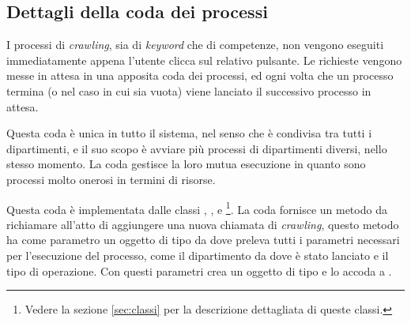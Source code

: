 \documentclass[tesi.tex]{subfiles}
\begin{document}
\subsection{Dettagli della coda dei processi}\label{sec:codaprocessi}
I processi di \emph{crawling}, sia di \emph{keyword} che di
competenze, non vengono eseguiti immediatamente appena l'utente clicca
sul relativo pulsante. Le richieste vengono messe in attesa in una
apposita coda dei processi, ed ogni volta che un processo termina (o
nel caso in cui sia vuota) viene lanciato il successivo processo in attesa.

Questa coda \`e unica in tutto il sistema, nel senso che \`e condivisa
tra tutti i dipartimenti, e il suo scopo \`e avviare pi\`u processi di
dipartimenti diversi, nello stesso momento. La coda gestisce la loro
mutua esecuzione in
quanto sono processi molto onerosi in termini di risorse.

Questa coda \`e implementata dalle classi ,
, e \footnote{Vedere la
  sezione \ref{sec:classi} per la descrizione dettagliata di queste
  classi.}. La coda fornisce un metodo  da richiamare
all'atto di aggiungere una nuova chiamata di \emph{crawling}, questo
metodo ha come parametro un oggetto di tipo 
da dove preleva tutti i parametri necessari per l'esecuzione del
processo, come il dipartimento da dove \`e stato lanciato e il tipo di
operazione. Con questi parametri crea un oggetto di tipo
 e lo accoda a .
\end{document}

